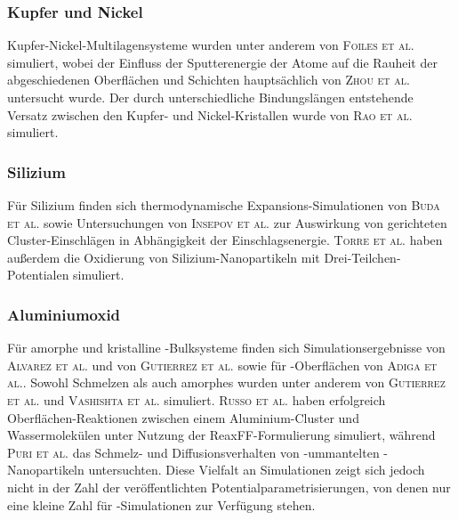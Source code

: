 \subsubsection{Kupfer und Nickel}
Kupfer-Nickel-Multilagensysteme wurden unter anderem von \textsc{Foiles et al.}\cite{foiles_calculation_1985} simuliert, wobei der Einfluss der Sputterenergie der Atome auf die Rauheit der abgeschiedenen Oberflächen und Schichten hauptsächlich von \textsc{Zhou et al.}\cite{zhou_atomistic_1998} untersucht wurde.
Der durch unterschiedliche Bindungslängen entstehende Versatz zwischen den Kupfer- und Nickel-Kristallen wurde von \textsc{Rao et al.}\cite{rao_atomistic_2000} simuliert.

\subsubsection{Silizium}
Für Silizium finden sich thermodynamische Expansions-Simulationen von \textsc{Buda et al.}\cite{buda_thermal_1990} sowie Untersuchungen von \textsc{Insepov et al.}\cite{insepov_molecular_1995} zur Auswirkung von gerichteten Cluster-Ein\-schlägen in Abhängigkeit der Einschlagsenergie.
\textsc{Torre et al.}\cite{torre_study_2002} haben außerdem die Oxidierung von Silizium-Nanopartikeln mit Drei-Teilchen-Potentialen simuliert.

\subsubsection{Aluminiumoxid}
Für amorphe und kristalline -Bulksysteme finden sich Simulationsergebnisse von \textsc{Alvarez et al.}\cite{alvarez_computer_1995,alvarez_molecular_1992} und von \textsc{Gutierrez et al.}\cite{gutierrez_molecular_2002} sowie für -Oberflächen von \textsc{Adiga et al.}\cite{adiga_atomistic_2006}.
Sowohl Schmelzen als auch amorphes  wurden unter anderem von \textsc{Gutierrez et al.}\cite{gutierrez_structural_2000} und \textsc{Vashishta et al.}\cite{vashishta_interaction_2008} simuliert.
\textsc{Russo et al.}\cite{russo_molecular_2011} haben erfolgreich Oberflächen-Reaktionen zwischen einem Aluminium-Cluster und Wassermolekülen unter Nutzung der ReaxFF-Formulierung simuliert, während \textsc{Puri et al.}\cite{puri_thermo-mechanical_2010} das Schmelz- und Diffusionsverhalten von -ummantelten -Nanopartikeln untersuchten.
Diese Vielfalt an Simulationen zeigt sich jedoch nicht in der Zahl der veröffentlichten Potentialparametrisierungen, von denen nur eine kleine Zahl für -Simulationen zur Verfügung stehen.

